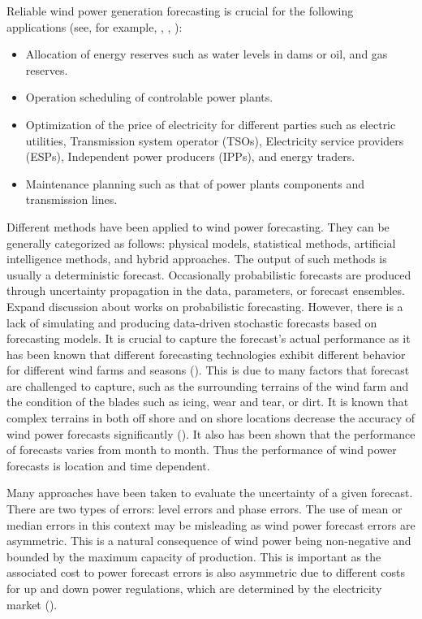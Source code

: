 \documentclass[11pt]{article}
\theoremstyle{definition}
\begin{document}
Reliable wind power generation forecasting is crucial for the following applications (see, for example, \cite[5]{gieb}, \cite[162]{chang}, \cite{zhbo}):
\begin{itemize}
\item Allocation of energy reserves such as water levels in dams or oil, and gas reserves.
\item Operation scheduling of controlable power plants.
\item Optimization of the price of electricity for different parties such as electric utilities, Transmission system operator (TSOs), Electricity service providers (ESPs), Independent power producers (IPPs), and energy traders.
\item Maintenance planning such as that of power plants components and transmission lines.

\end{itemize}

Different methods have been applied to wind power forecasting. They can be generally categorized as follows: physical models, statistical methods, artificial intelligence methods, and hybrid approaches. The output of such methods is usually a deterministic forecast. Occasionally probabilistic forecasts are produced through uncertainty propagation in the data, parameters, or forecast ensembles. {\color{red} Expand discussion about works on probabilistic forecasting.} However, there is a lack of simulating and producing data-driven stochastic forecasts based on forecasting models. It is crucial to capture the forecast's actual performance as it has been known that different forecasting technologies exhibit different behavior for different wind farms and seasons (\cite{chang}). This is due to many factors that forecast are challenged to capture, such as the surrounding terrains of the wind farm and the condition of the blades such as icing, wear and tear, or dirt. It is known that complex terrains in both off shore and on shore locations decrease the accuracy of wind power forecasts significantly (\cite{schicker2017short}). It also has been shown that the performance of forecasts varies from month to month. Thus the performance of wind power forecasts is location and time dependent.

Many approaches have been taken to evaluate the uncertainty of a given forecast. There are two types of errors: level errors and phase errors. The use of mean or median errors in this context may be misleading as wind power forecast errors are asymmetric. This is a natural consequence of wind power being non-negative and bounded by the maximum capacity of production. This is important as the associated cost to power forecast errors is also asymmetric due to different costs for up and down power regulations, which are determined by the electricity market (\cite{tsitsiklis2015pricing}).
\end{document}

